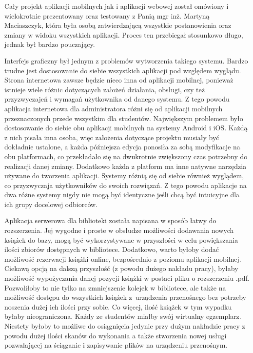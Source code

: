 \documentclass[twoside]{projektInzynierskiMS}
\begin{document}
Cały projekt aplikacji mobilnych jak i aplikacji webowej został omówiony i wielokrotnie prezentowany oraz testowany z Panią mgr inż. Martyną Maciaszczyk, która była osobą zatwierdzającą wszystkie postanowienia oraz zmiany w widoku wszystkich aplikacji. Proces ten przebiegał stosunkowo długo, jednak był bardzo pouczający.

Interfejs graficzny był jednym z problemów wytworzenia takiego systemu. Bardzo trudne jest dostosowanie do siebie wszystkich aplikacji pod względem wyglądu. Strona internetowa zawsze będzie nieco inna od aplikacji mobilnej, ponieważ istnieje wiele różnic dotyczących założeń działania, obsługi, czy też przyzwyczajeń i wymagań użytkownika od danego systemu. Z tego powodu aplikacja internetowa dla administratora różni się od aplikacji mobilnych przeznaczonych przede wszystkim dla studentów. Największym problemem było dostosowanie do siebie obu aplikacji mobilnych na systemy Android i iOS. Każdą z nich pisała inna osoba, więc założenia dotyczące projektu musiały być dokładnie ustalone, a każda późniejsza edycja ponosiła za sobą modyfikacje na obu platformach, co przekładało się na dwukrotnie zwiększony czas potrzebny do realizacji danej zmiany. Dodatkowo każda z platform ma inne natywne narzędzia używane do tworzenia aplikacji. Systemy różnią się od siebie również wyglądem, co przyzwyczaja użytkowników do swoich rozwiązań. Z tego powodu aplikacje na dwa różne systemy nigdy nie mogą być identyczne jeśli chcą być intuicyjne dla ich grupy docelowej odbiorców.

Aplikacja serwerowa dla biblioteki została napisana w sposób łatwy do rozszerzenia. Jej wygodne i proste w obsłudze możliwości dodawania nowych książek do bazy, mogą być wykorzystywane w przyszłości w celu powiększania ilości zbiorów dostępnych w bibliotece. Dodatkowo, warto byłoby dodać możliwość rezerwacji książki online, bezpośrednio z poziomu aplikacji mobilnej. Ciekawą opcją na dalszą przyszłość (z powodu dużego nakładu pracy), byłaby możliwość wypożyczania danej pozycji książki w postaci pliku o rozszerzeniu .pdf. Pozwoliłoby to nie tylko na zmniejszenie kolejek w bibliotece, ale także na możliwość dostępu do wszystkich książek z~urządzenia przenośnego bez potrzeby noszenia dużej ich ilości przy sobie. Co więcej, ilość książek w tym wypadku byłaby nieograniczona. Każdy ze studentów miałby swój wirtualny egzemplarz. Niestety byłoby to możliwe do osiągnięcia jedynie przy dużym nakładzie pracy z powodu dużej ilości skanów do wykonania a także stworzenia nowej usługi pozwalającej na ściąganie i zapisywanie plików na urządzeniu przenośnym.
\end{document}
